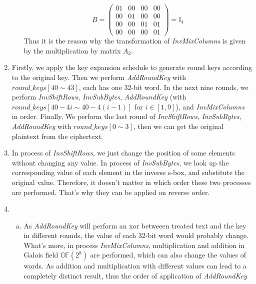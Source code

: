 \documentclass[12pt, a4paper]{article}
\begin{document}
\begin{enumerate}
\begin{enumerate}[a)]
                  $$ B = 
                  \begin{pmatrix}
                        01 & 00 & 00 & 00\\
                        00 & 01 & 00 & 00\\
                        00 & 00 & 01 & 01\\
                        00 & 00 & 00 & 01
                  \end{pmatrix} = \mathbb{I}_4
                  $$
                  Thus it is the reason why the transformation of \emph{InvMixColumns} is given by the multiplication by matrix $A_2$. 
            \end{enumerate} 
      \item Firstly, we apply the key expansion schedule to generate round keys according to the original key. 
            Then we perform \emph{AddRoundKey} with $round\_keys[40 \sim 43]$, each has one 32-bit word.\newline
            In the next nine rounds, we perform \emph{InvShiftRows}, \emph{InvSubBytes}, \emph{AddRoundKey} 
            (with $round\_keys[40-4i \sim 40-4(i-1)]$ for $i \in [1, 9]$), and \emph{InvMixColumns} in order.\newline
            Finally, We perform the last round of \emph{InvShiftRows}, \emph{InvSubBytes}, \emph{AddRoundKey} 
            with $round\_keys[0 \sim 3]$, then we can get the original plaintext from the ciphertext.
      \item In process of \emph{InvShiftRows}, we just change the position of some elements without changing any value. 
            In process of \emph{InvSubBytes}, we look up the corresponding value of each element in the inverse s-box, 
            and substitute the original value. Therefore, it doesn't matter in which order these two processes are performed. 
            That's why they can be applied on reverse order.
      \item \begin{enumerate}[a)]
                  \item As \emph{AddRoundKey} will perform an xor betweeen treated text and the key in different rounds, 
                        the value of each 32-bit word would probably change. What's more, in process \emph{InvMixColumns}, 
                        multiplication and addition in Galois field $\mathbb{GF}(2^8)$ are performed, 
                        which can also change the values of words. As addition and multiplication with different values 
                        can lead to a completely distinct result, thus the order of application of \emph{AddRoundKey} 

\end{enumerate}
\end{enumerate}
\end{document}
